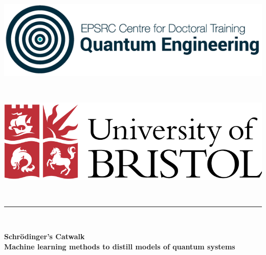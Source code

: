 \begin{titlepage}

    \newcommand{\HRule}{\rule{\linewidth}{0.5mm}} %
    
    \center %
     
    \vspace{1cm}
    \begin{minipage}{0.4\textwidth}
    \begin{flushleft} 
        \includegraphics[scale=2]{logos/qecdt.png}
    \end{flushleft}
    \end{minipage}
    ~
    \begin{minipage}{0.4\textwidth}
    \begin{flushright} \large
        \includegraphics[scale=0.2]{logos/bristol_uni.png}
    \end{flushright}
    \end{minipage}\\[1cm]
    
    \vspace{3.5cm}
    \HRule \\[0.4cm]
    { \LARGE \bfseries Schr\"odinger's Catwalk \\
     \large  Machine learning methods to distill models of quantum systems
    
}
\end{titlepage}
